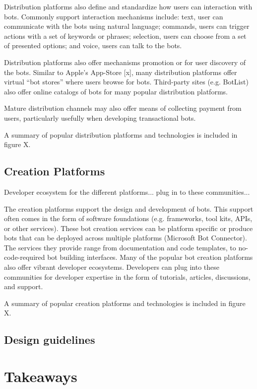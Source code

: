 \documentclass{sig-alternate}
\begin{document}
	Distribution platforms also define and standardize how users can interaction with bots.  Commonly support interaction mechanisms include: text, user can communicate with the bots using natural language; commands, users can trigger actions with a set of keywords or phrases; selection, users can choose from a set of presented options; and voice, users can talk to the bots.

	Distribution platforms also offer mechanisms promotion or for user discovery of the bots. Similar to Apple's App-Store [x], many distribution platforms offer virtual ``bot stores'' where users browse for bots. Third-party sites (e.g. BotList) also offer online catalogs of bots for many popular distribution platforms. 

	Mature distribution channels may also offer means of collecting payment from users, particularly usefully when developing transactional bots.

	A summary of popular distribution platforms and technologies is included in figure X.

	\subsection{Creation Platforms}
	Developer ecosystem for the different platforms...  plug in to these communities...

	The creation platforms support the design and development of bots. This support often comes in the form of software foundations (e.g. frameworks, tool kits, APIs, or other services). These bot creation services can be platform specific or produce bots that can be deployed across multiple platforms (Microsoft Bot Connector). The services they provide range from documentation and code templates, to no-code-required bot building interfaces. 
	Many of the popular bot creation platforms also offer vibrant developer ecosystems. Developers can plug into these communities for developer expertise in the form of tutorials, articles, discussions, and support.

	A summary of popular creation platforms and technologies is included in figure X.

	\subsection{Design guidelines}


\section{Takeaways}
\end{document}

